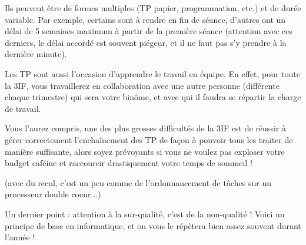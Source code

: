 Ils peuvent être de formes multiples (TP papier, programmation, etc.)
    et de durée variable. Par exemple, certains sont à rendre en fin de séance,
    d'autres ont un délai de 5 semaines maximum à partir de la première séance (attention
	avec ces derniers, le délai accordé est souvent piégeur, et il ne faut pas s'y prendre à la dernière minute).
    

Les TP sont aussi l'occasion d'apprendre le travail en équipe. En effet, pour toute la
3IF, vous travaillerez en collaboration avec une autre personne (différente chaque trimestre) qui
sera votre binôme, et avec qui il faudra se répartir la charge de travail.

Vous l'aurez compris, une des plus grosses difficultés de la 3IF est de réussir
à gérer correctement l'enchaînement des TP de façon à pouvoir tous les
traiter de manière suffisante, alors soyez prévoyants si vous ne voulez pas
exploser votre budget caféine et raccourcir drastiquement votre temps de sommeil !

(avec du recul, c'est un peu comme de l'ordonnancement de tâches sur un processeur
 double coeur...) 

Un dernier point : attention à la sur-qualité, c'est de la non-qualité ! Voici un principe de
base en informatique, et on vous le répètera bien assez souvent durant l'année !
